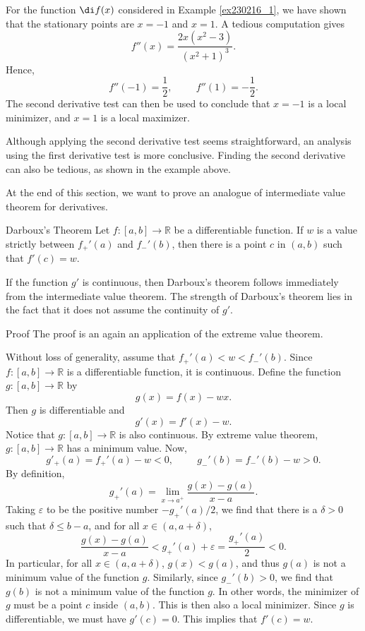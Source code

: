 \begin{example}{}
For the function $\di f(x)$ considered in Example \ref{ex230216_1}, we have shown that the stationary points are $x=-1$ and $x=1$. A tedious computation gives
\[f''(x)=\frac{2x(x^2-3)}{(x^2+1)^3}.\]
Hence,
\[f''(-1)=\frac{1}{2},\hspace{1cm}f''(1)=-\frac{1}{2}.\]The second derivative test can then be used to conclude that
$x=-1$ is a local minimizer, and $x=1$ is a local maximizer.
\end{example}
Although applying the second derivative test seems straightforward, an analysis using the first derivative test is more conclusive. Finding the second derivative can also be tedious, as shown in the example above.

At the end of this section, we want to prove an analogue of intermediate value theorem for derivatives.
\begin{theorem}{Darboux's Theorem}
Let $f:[a,b]\to\mathbb{R}$ be a differentiable function. If $w$ is a value strictly between $f_+'(a)$ and $f_-'(b)$, then there is a point $c$ in $(a, b)$ such that
$f'(c)=w$.
\end{theorem}If the function $g'$ is continuous, then Darboux's theorem follows immediately from the intermediate value theorem. The strength of Darboux's theorem lies in the fact that it does not     assume the continuity of $g'$. 

\begin{myproof}{Proof} The proof   is an again an application of the extreme value theorem.

 Without loss of generality,   assume that $f_+'(a)<w<f_-'(b)$. 
Since $f:[a,b]\to\mathbb{R}$ is a differentiable function, it is continuous. 
Define the function $g:[a,b]\to\mathbb{R}$ by
\[g(x)=f(x)-wx.\]\bp
Then $g$ is differentiable and
\[g'(x)=f'(x)-w.\]
Notice that $g:[a,b]\to\mathbb{R}$ is also continuous. By extreme value theorem, $g:[a,b]\to\mathbb{R}$ has a  minimum value. Now,
\[g'_+(a)=f_+'(a)-w<0,\hspace{1cm} g_-'(b)=f_-'(b)-w>0.\]
 By definition,
\[g_+'(a)=\lim_{x\to a^+}\frac{g(x)-g(a)}{x-a}.\] Taking $\varepsilon$ to be the positive number $-g_+'(a)/2$, we find that there is a $\delta>0$ such that $\delta\leq b-a$, and for all $x\in (a, a+\delta)$,  
\[\frac{g(x)-g(a)}{x-a}<g_+'(a)+\varepsilon= \frac{g_+'(a)}{2}<0.\]In particular, for all $x\in (a, a+\delta)$, $g(x)<g(a)$, and thus $g(a)$ is not a minimum value of the function $g$. Similarly, since $g_-'(b)>0$, we find that $g(b)$ is not a minimum value of the function $g$. In other words, the minimizer of $g$ must be a point $c$ inside $(a, b)$. This is then also a local minimizer. Since $g$ is differentiable, we must have $g'(c)=0$. This implies that $f'(c)=w$.

\end{myproof}

